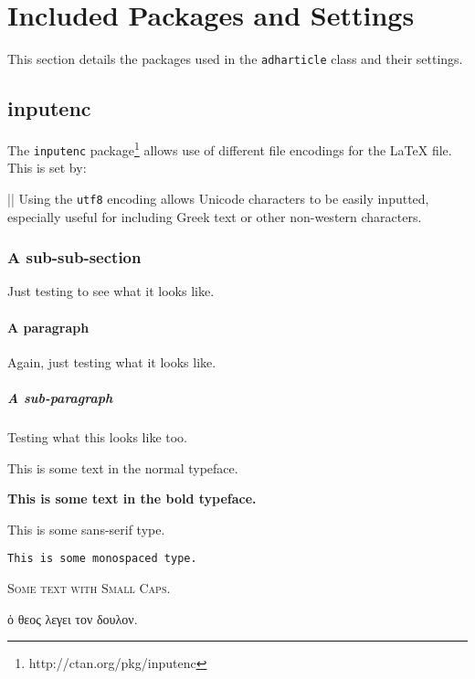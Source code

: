 \documentclass[electronic,timesopt]{adharticle} %
\begin{document}

\section{Included Packages and Settings}


This section details the packages used in the \texttt{adharticle} class and
their settings.

\subsection{inputenc}

The \texttt{inputenc} package\footnote{http://ctan.org/pkg/inputenc} allows use
of different file encodings for the LaTeX file. This is set by:

\latex|\RequirePackage[utf8]{inputenc}|
Using the \texttt{utf8} encoding allows Unicode characters to be easily
inputted, especially useful for including Greek text or other non-western
characters.

\subsubsection{A sub-sub-section}

Just testing to see what it looks like.

\paragraph{A paragraph}

Again, just testing what it looks like.

\subparagraph{A sub-paragraph}

Testing what this looks like too.

This is some text in the normal typeface.

\textbf{This is some text in the bold typeface.}

\textsf{This is some sans-serif type.}

\texttt{This is some monospaced type.}

\textsc{Some text with Small Caps.}


ὁ θεος λεγει τον δουλον.

\end{document}

